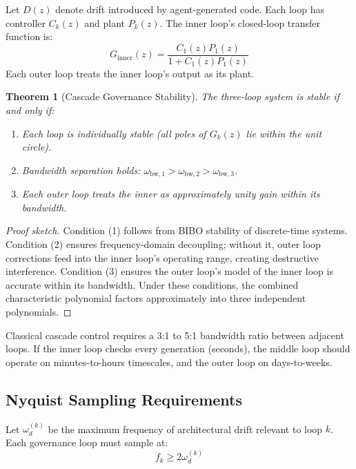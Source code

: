 \documentclass[11pt, a4paper, logo, copyright]{googledeepmind}
\newtheorem{theorem}{Theorem}[section]
\begin{document}
Let $D(z)$ denote drift introduced by agent-generated code. Each loop has controller $C_k(z)$ and plant $P_k(z)$. The inner loop's closed-loop transfer function is:
\begin{equation}
    G_{\mathrm{inner}}(z) = \frac{C_1(z) P_1(z)}{1 + C_1(z) P_1(z)}
\end{equation}
Each outer loop treats the inner loop's output as its plant.

\begin{theorem}[Cascade Governance Stability]
\label{thm:cascade-stability}
The three-loop system is stable if and only if:
\begin{enumerate}
    \item Each loop is individually stable (all poles of $G_k(z)$ lie within the unit circle).
    \item Bandwidth separation holds: $\omega_{\mathrm{bw},1} > \omega_{\mathrm{bw},2} > \omega_{\mathrm{bw},3}$.
    \item Each outer loop treats the inner as approximately unity gain within its bandwidth.
\end{enumerate}
\end{theorem}

\begin{proof}[Proof sketch]
Condition (1) follows from BIBO stability of discrete-time systems. Condition (2) ensures frequency-domain decoupling; without it, outer loop corrections feed into the inner loop's operating range, creating destructive interference. Condition (3) ensures the outer loop's model of the inner loop is accurate within its bandwidth. Under these conditions, the combined characteristic polynomial factors approximately into three independent polynomials.
\end{proof}

Classical cascade control requires a 3:1 to 5:1 bandwidth ratio between adjacent loops. If the inner loop checks every generation (seconds), the middle loop should operate on minutes-to-hours timescales, and the outer loop on days-to-weeks.

\subsection{Nyquist Sampling Requirements}

Let $\omega_d^{(k)}$ be the maximum frequency of architectural drift relevant to loop $k$. Each governance loop must sample at:
\begin{equation}
    f_k \geq 2\omega_d^{(k)}
\end{equation}
\end{document}
